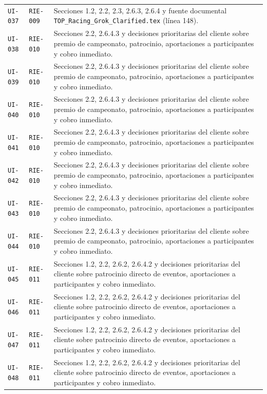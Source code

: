 \documentclass[10pt,letterpaper]{article}
\begin{document}
\begin{landscape}
\begin{longtable}{P{2.7cm}P{2.6cm}P{15.7cm}}
\texttt{UI-037} & \texttt{RIE-009} & Secciones 1.2, 2.2, 2.3, 2.6.3, 2.6.4 y fuente documental \texttt{TOP\_Racing\_Grok\_Clarified.tex} (línea 148).\\
\texttt{UI-038} & \texttt{RIE-010} & Secciones 2.2, 2.6.4.3 y decisiones prioritarias del cliente sobre premio de campeonato, patrocinio, aportaciones a participantes y cobro inmediato.\\
\texttt{UI-039} & \texttt{RIE-010} & Secciones 2.2, 2.6.4.3 y decisiones prioritarias del cliente sobre premio de campeonato, patrocinio, aportaciones a participantes y cobro inmediato.\\
\texttt{UI-040} & \texttt{RIE-010} & Secciones 2.2, 2.6.4.3 y decisiones prioritarias del cliente sobre premio de campeonato, patrocinio, aportaciones a participantes y cobro inmediato.\\
\texttt{UI-041} & \texttt{RIE-010} & Secciones 2.2, 2.6.4.3 y decisiones prioritarias del cliente sobre premio de campeonato, patrocinio, aportaciones a participantes y cobro inmediato.\\
\texttt{UI-042} & \texttt{RIE-010} & Secciones 2.2, 2.6.4.3 y decisiones prioritarias del cliente sobre premio de campeonato, patrocinio, aportaciones a participantes y cobro inmediato.\\
\texttt{UI-043} & \texttt{RIE-010} & Secciones 2.2, 2.6.4.3 y decisiones prioritarias del cliente sobre premio de campeonato, patrocinio, aportaciones a participantes y cobro inmediato.\\
\texttt{UI-044} & \texttt{RIE-010} & Secciones 2.2, 2.6.4.3 y decisiones prioritarias del cliente sobre premio de campeonato, patrocinio, aportaciones a participantes y cobro inmediato.\\
\texttt{UI-045} & \texttt{RIE-011} & Secciones 1.2, 2.2, 2.6.2, 2.6.4.2 y decisiones prioritarias del cliente sobre patrocinio directo de eventos, aportaciones a participantes y cobro inmediato.\\
\texttt{UI-046} & \texttt{RIE-011} & Secciones 1.2, 2.2, 2.6.2, 2.6.4.2 y decisiones prioritarias del cliente sobre patrocinio directo de eventos, aportaciones a participantes y cobro inmediato.\\
\texttt{UI-047} & \texttt{RIE-011} & Secciones 1.2, 2.2, 2.6.2, 2.6.4.2 y decisiones prioritarias del cliente sobre patrocinio directo de eventos, aportaciones a participantes y cobro inmediato.\\
\texttt{UI-048} & \texttt{RIE-011} & Secciones 1.2, 2.2, 2.6.2, 2.6.4.2 y decisiones prioritarias del cliente sobre patrocinio directo de eventos, aportaciones a participantes y cobro inmediato.\\

\end{longtable}
\end{landscape}
\end{document}
